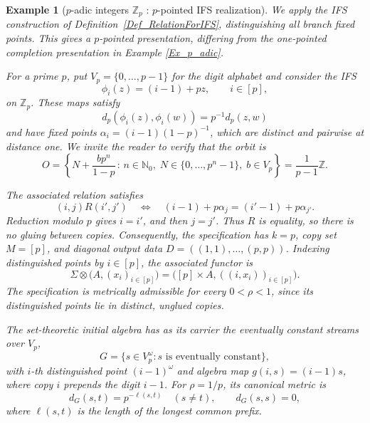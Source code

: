 \documentclass{sn-jnl}%
\theoremstyle{thmstyleone}%
\theoremstyle{thmstyletwo}%
\newtheorem{example}{Example}%
\theoremstyle{thmstylethree}%
\newcommand{\M}{\Sigma}
\newcommand{\F}{\M\otimes}
\newcommand{\f}{\phi}
\begin{document}
\begin{example}[$p$-adic integers $\mathbb Z_p$ : $p$-pointed IFS realization]
\label{Ex_p_adicIFS}
    We apply the IFS construction of Definition~\ref{Def_RelationForIFS}, distinguishing all branch fixed points. This gives a $p$-pointed presentation, differing from the one-pointed completion presentation in Example \ref{Ex_p_adic}.
    
    For a prime $p$, put $V_p=\{0,\ldots,p-1\}$ for the digit alphabet and consider the IFS
    \begin{equation} 
    \nonumber
        \f_i(z)=(i-1)+pz,\qquad i\in[p],
    \end{equation}
    on $\mathbb Z_p$. These maps satisfy
    \begin{equation} 
    \nonumber
        d_p(\f_i(z),\f_i(w))=p^{-1}d_p(z,w)
    \end{equation}
    and have fixed points $\alpha_i=(i-1)(1-p)^{-1}$, which are distinct and pairwise at distance one. We invite the reader to verify that the orbit is 
    \begin{equation} 
    \nonumber
        O=\left\{ N+\frac{bp^n}{1-p}\,:\, n\in\mathbb N_0,\; N\in\{0, \ldots,p^n-1\},\; b\in V_p \right\} = \frac{1}{p-1}\mathbb Z.
    \end{equation}
    
    The associated relation satisfies
    \begin{equation} 
    \nonumber
        (i,j)R(i',j') \quad \Longleftrightarrow \quad (i-1)+p\alpha_j=(i'-1)+p\alpha_{j'}. 
    \end{equation}
    Reduction modulo $p$ gives $i=i'$, and then $j=j'$. Thus $R$ is equality, so there is no gluing between copies. Consequently, the specification has $k=p$, copy set $M=[p]$, and diagonal output data $D=((1,1),\ldots,(p,p))$. Indexing distinguished points by $i\in[p]$, the associated functor is 
    \begin{equation} 
    \nonumber
        \F\bigl(A,(x_i)_{i\in[p]}\bigr) = \bigl([p]\times A,((i,x_i))_{i\in[p]}\bigr).
    \end{equation}
    The specification is metrically admissible for every $0<\rho<1$, since its distinguished points lie in distinct, unglued copies. 
    
    The set-theoretic initial algebra has as its carrier the eventually constant streams over $V_p$,
    \begin{equation} 
    \nonumber
        G=\{s\in V_p^\omega : s\text{ is eventually constant}\},
    \end{equation}
    with $i$-th distinguished point $(i-1)^\omega$ and algebra map $g(i,s)=(i-1)s$, where copy $i$ prepends the digit $i-1$. For $\rho=1/p$, its canonical metric is
    \begin{equation} 
    \nonumber
        d_G(s,t)=p^{-\ell(s,t)}\quad(s\ne t), \qquad d_G(s,s)=0,
    \end{equation}
    where $\ell(s,t)$ is the length of the longest common prefix.
    

\end{example}
\end{document}
